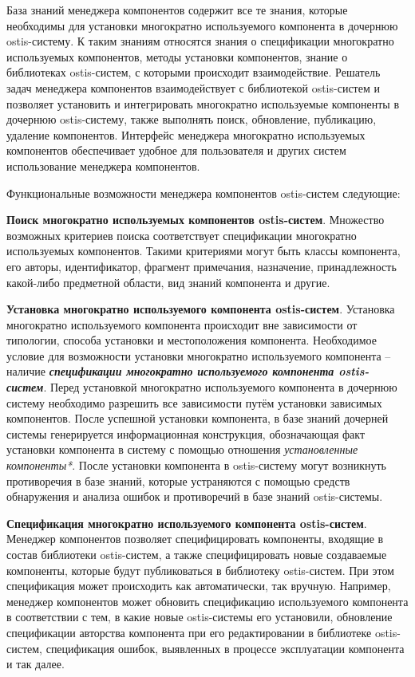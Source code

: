База знаний менеджера компонентов содержит все те знания, которые необходимы для установки многократно используемого компонента в дочернюю ostis-систему. К таким знаниям относятся знания о спецификации многократно используемых компонентов, методы установки компонентов, знание о  библиотеках ostis-систем, с которыми происходит взаимодействие. Решатель задач менеджера компонентов взаимодействует с библиотекой ostis-систем и позволяет установить и интегрировать многократно используемые компоненты в дочернюю ostis-систему, также выполнять поиск, обновление, публикацию, удаление компонентов. Интерфейс менеджера многократно используемых компонентов обеспечивает удобное для пользователя и других систем использование менеджера компонентов.

Функциональные возможности менеджера компонентов ostis-систем следующие:
\begin{textitemize}
	\item{\textbf{Поиск многократно используемых компонентов ostis-систем}. Множество возможных критериев поиска соответствует спецификации многократно используемых компонентов. Такими критериями могут быть классы компонента, его авторы, идентификатор, фрагмент примечания, назначение, принадлежность какой-либо предметной области, вид знаний компонента и другие.}
	\item{\textbf{Установка многократно используемого компонента ostis-систем}. Установка многократно используемого компонента происходит вне зависимости от типологии, способа установки и местоположения компонента. Необходимое условие для возможности установки многократно используемого компонента -- наличие \textbf{\textit{спецификации многократно используемого компонента ostis-систем}}. Перед установкой многократно используемого компонента в дочернюю систему необходимо разрешить все зависимости путём установки зависимых компонентов. После успешной установки компонента, в базе знаний дочерней системы генерируется информационная конструкция, обозначающая факт установки компонента в систему с помощью отношения \textit{установленные компоненты*}. После установки компонента в ostis-систему могут возникнуть противоречия в базе знаний, которые  устраняются с помощью средств обнаружения и анализа ошибок и противоречий в базе знаний ostis-системы.}
	\item{\textbf{Спецификация многократно используемого компонента ostis-систем}. Менеджер компонентов позволяет специфицировать компоненты, входящие в состав библиотеки ostis-систем, а также специфицировать новые создаваемые компоненты, которые будут публиковаться в библиотеку ostis-систем. При этом спецификация может происходить как автоматически, так вручную. Например, менеджер компонентов может обновить спецификацию используемого компонента в соответствии с тем, в какие новые ostis-системы его установили, обновление спецификации авторства компонента при его редактировании в библиотеке ostis-систем, спецификация ошибок, выявленных в процессе эксплуатации компонента и так далее.}

\end{textitemize}
